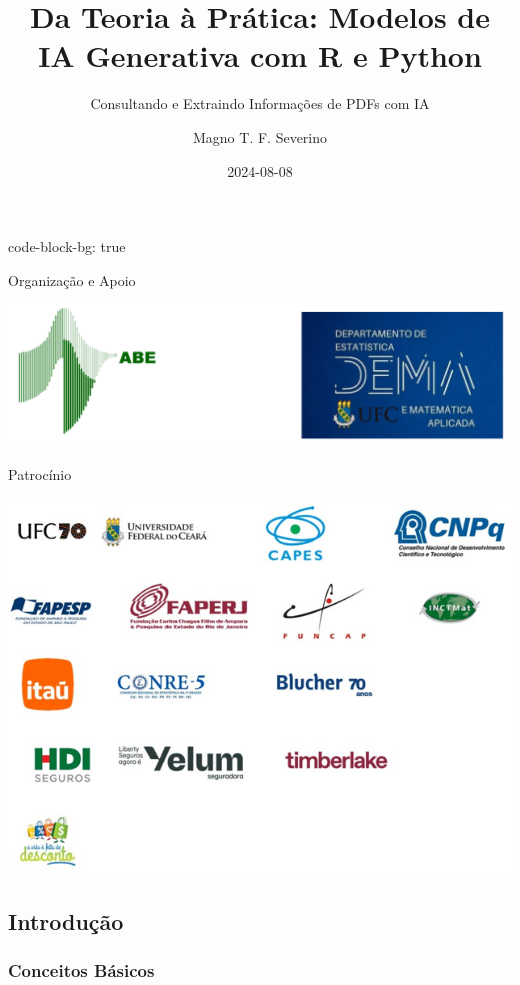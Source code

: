 \documentclass[
  letterpaper,
  DIV=11,
  numbers=noendperiod]{scrartcl}
\title{Da Teoria à Prática: Modelos de IA Generativa com R e Python}
\subtitle{Consultando e Extraindo Informações de PDFs com IA}
\author{Magno T. F. Severino}
\date{2024-08-08}
\renewcommand*\contentsname{Índice}
\newcommand\contentsname{Índice}
\begin{document}
\maketitle
\ifdefined\Shaded\renewenvironment{Shaded}{\begin{tcolorbox}[borderline west={3pt}{0pt}{shadecolor}, interior hidden, sharp corners, frame hidden, breakable, enhanced, boxrule=0pt]}{\end{tcolorbox}}\fi

\renewcommand*\contentsname{Índice}
{
\hypersetup{linkcolor=}
\setcounter{tocdepth}{3}
\tableofcontents
}
code-block-bg: true

Organização e Apoio

\includegraphics{img/organizacao.png}

Patrocínio

\includegraphics{img/patrocinio.png}

\hypertarget{introduuxe7uxe3o}{%
\subsection{Introdução}\label{introduuxe7uxe3o}}

\hypertarget{conceitos-buxe1sicos}{%
\subsubsection{Conceitos Básicos}\label{conceitos-buxe1sicos}}
\end{document}
